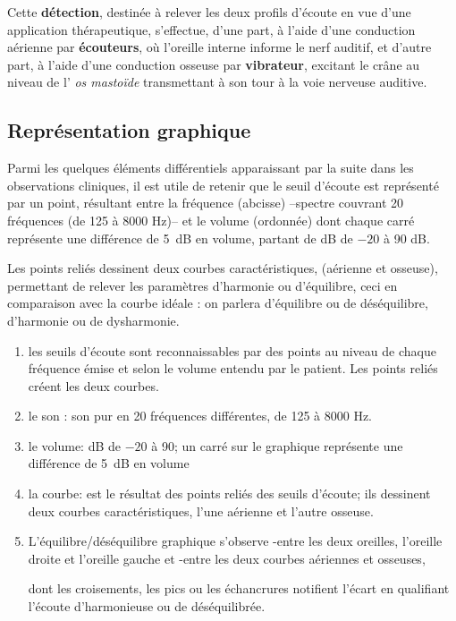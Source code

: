 Cette \textbf{détection}, destinée à relever les deux profils d'écoute
en vue d'une application thérapeutique,
s'effectue, d'une part, à l'aide d'une
conduction aérienne par \textbf{écouteurs}, où l'oreille interne
informe le nerf auditif,  et d'autre part, à l'aide
d'une conduction osseuse par\textbf{ vibrateur}, excitant le crâne au
niveau de l'
\textit{os mastoïde} transmettant à son tour à  la voie nerveuse
auditive.

\subsection{Représentation graphique}

Parmi les quelques éléments différentiels
apparaissant par la suite dans les observations cliniques, il est utile de retenir
que le seuil d'écoute est représenté par un point, résultant entre la
fréquence (abcisse) --spectre couvrant 20
fréquences (de 125 à 8000 Hz)--   et le volume
(ordonnée) dont chaque carré représente une différence de \SI{5}{\dB} en
volume, partant de dB de $-20$ à 90 dB.


Les points reliés dessinent deux courbes caractéristiques, (aérienne
et osseuse), permettant de relever les paramètres d'harmonie ou
          d'équilibre, ceci
 	en comparaison avec la courbe idéale : on parlera
        d'équilibre ou de
 	déséquilibre, d'harmonie ou de dysharmonie.

        \begin{enumerate}

  \item   les seuils d'écoute sont reconnaissables par des points au niveau de
          chaque fréquence émise et selon le volume entendu par le
          patient. Les points reliés créent les deux courbes.
 	\item le son : son pur en 20 fréquences différentes, de 125 à 8000 Hz.
 	\item le volume: dB de $-20$ à 90; un carré sur le graphique représente une différence de \SI{5}{\dB} en
 		volume
 	\item la courbe: est le résultat des points reliés des seuils
          d'écoute; ils
          dessinent deux courbes caractéristiques, l'une aérienne et l'autre osseuse.


      \item L'équilibre/déséquilibre graphique s'observe
        -entre les deux oreilles, l'oreille droite et l'oreille gauche
        et
        -entre les deux courbes aériennes et osseuses,

        dont les
        croisements, les pics ou les échancrures notifient
        l'écart en
        qualifiant l'écoute d'harmonieuse ou de
        déséquilibrée.
      \end{enumerate}


